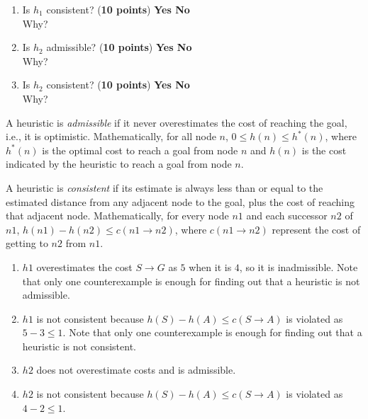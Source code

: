 \begin{enumerate}
\begin{enumerate}
      \item Is $h_1$ consistent? (\textbf{10 points}) \textbf{Yes \hspace{5pt} {\color{red} No}}\\
      Why?
      \vspace{2cm}

      \item Is $h_2$ admissible? (\textbf{10 points}) \textbf{{\color{red} Yes} \hspace{5pt} No}\\
      Why?
      \vspace{2cm}

      \item Is $h_2$ consistent? (\textbf{10 points}) \textbf{Yes \hspace{5pt} {\color{red}No}}\\
      Why?
      \vspace{2cm}

  \end{enumerate}

{\color{red}
A heuristic is \textit{admissible} if it never overestimates the cost of reaching the goal, i.e., it is optimistic. Mathematically, for all node $n$, $0\leq h(n)\leq h^*(n)$, where $h^*(n)$ is the optimal cost to reach a goal from node $n$ and $h(n)$ is the cost indicated by the heuristic to reach a goal from node $n$.

\vspace{0.5cm}

A heuristic is \textit{consistent} if its estimate is always less than or equal to the estimated distance from any adjacent node to the goal, plus the cost of reaching that adjacent node. Mathematically, for every node $n1$ and each successor $n2$ of $n1$, $h(n1)-h(n2)\leq c(n1 \rightarrow n2)$, where $c(n1 \rightarrow n2)$ represent the cost of getting to $n2$ from $n1$.

\vspace{0.5cm}

\begin{enumerate}
\item $h1$ overestimates the cost $S \to G$ as $5$ when it is $4$, so it is inadmissible. Note that only one counterexample is enough for finding out that a heuristic is not admissible. 

\item $h1$ is not consistent because $h(S) - h(A) \leq c(S \to A)$ is violated as $5 - 3 \leq 1$. Note that only one counterexample is enough for finding out that a heuristic is not consistent. 

\item $h2$ does not overestimate costs and is admissible. 

\item $h2$ is not consistent because $h(S) - h(A) \leq c(S \to A)$ is violated as $4 - 2 \leq 1$.
\end{enumerate}

}

\end{enumerate}
